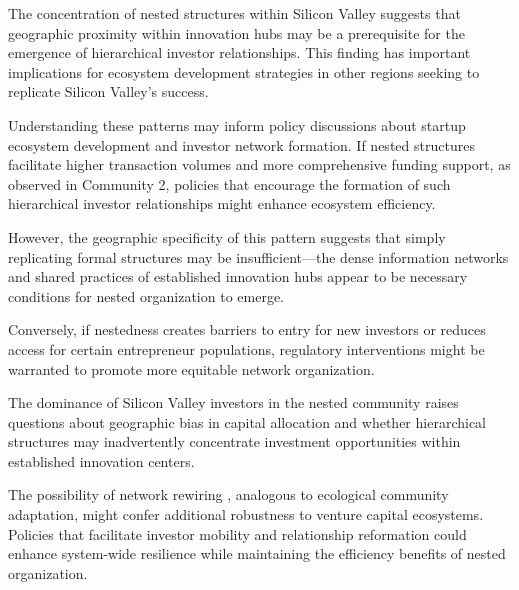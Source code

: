 The concentration of nested structures within Silicon Valley suggests that geographic proximity within innovation hubs may be a prerequisite for the emergence of hierarchical investor relationships. This finding has important implications for ecosystem development strategies in other regions seeking to replicate Silicon Valley's success. 

Understanding these patterns may inform policy discussions about startup ecosystem development and investor network formation. If nested structures facilitate higher transaction volumes and more comprehensive funding support, as observed in Community 2, policies that encourage the formation of such hierarchical investor relationships might enhance ecosystem efficiency. 

However, the geographic specificity of this pattern suggests that simply replicating formal structures may be insufficient—the dense information networks and shared practices of established innovation hubs appear to be necessary conditions for nested organization to emerge.

Conversely, if nestedness creates barriers to entry for new investors or reduces access for certain entrepreneur populations, regulatory interventions might be warranted to promote more equitable network organization. 

The dominance of Silicon Valley investors in the nested community raises questions about geographic bias in capital allocation and whether hierarchical structures may inadvertently concentrate investment opportunities within established innovation centers.

The possibility of network rewiring , analogous to ecological community adaptation, might confer additional robustness to venture capital ecosystems. Policies that facilitate investor mobility and relationship reformation could enhance system-wide resilience while maintaining the efficiency benefits of nested organization.



